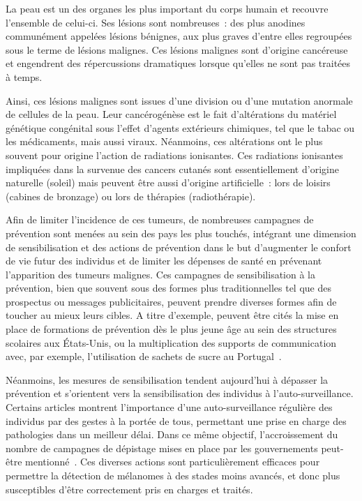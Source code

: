 \renewcommand{\thechapter}{\roman{chapter}}
\setcounter{chapter}{1}
\setcounter{figure}{0}

\label{chap:introduction}
La peau est un des organes les plus important du corps humain et recouvre l'ensemble de celui-ci. Ses lésions sont nombreuses~: des plus anodines communément appelées lésions bénignes, aux plus graves d'entre elles regroupées sous le terme de lésions malignes. Ces lésions malignes sont d'origine cancéreuse et engendrent des répercussions dramatiques lorsque qu'elles ne sont pas traitées à temps.\par

Ainsi, ces lésions malignes sont issues d’une division ou d’une mutation anormale de cellules de la peau. Leur cancérogénèse est le fait d'altérations du matériel génétique congénital sous l'effet d'agents extérieurs chimiques, tel que le tabac ou les médicaments, mais aussi viraux. Néanmoins, ces altérations ont le plus souvent pour origine l'action de radiations ionisantes. Ces radiations ionisantes impliquées dans la survenue des cancers cutanés sont essentiellement d'origine naturelle (soleil) mais peuvent être aussi d'origine artificielle~: lors de loisirs (cabines de bronzage) ou lors de thérapies (radiothérapie).\par

Afin de limiter l’incidence de ces tumeurs, de nombreuses campagnes de prévention sont menées au sein des pays les plus touchés, intégrant une dimension de sensibilisation et des actions de prévention dans le but d’augmenter le confort de vie futur des individus et de limiter les dépenses de santé en prévenant l'apparition des tumeurs malignes. Ces campagnes de sensibilisation à la prévention, bien que souvent sous des formes plus traditionnelles tel que des prospectus ou messages publicitaires, peuvent prendre diverses formes afin de toucher au mieux leurs cibles. A titre d’exemple, 
peuvent être cités la mise en place de formations de prévention dès le plus jeune âge au sein des structures scolaires aux États-Unis, ou la multiplication des supports de communication avec, par exemple, l’utilisation de sachets de sucre au Portugal~\cite{Correia2017,Guy2016}.\par 

Néanmoins, les mesures de sensibilisation tendent aujourd’hui à dépasser la prévention et s'orientent vers la sensibilisation des individus à l'auto-surveillance. Certains articles montrent l’importance d’une auto-surveillance régulière des individus par des gestes à la portée de tous, permettant une prise en charge des pathologies dans un meilleur délai. Dans ce même objectif, l’accroissement du nombre de campagnes de dépistage mises en place par les gouvernements peut-être mentionné~\cite{Friedman1985}. Ces diverses actions sont particulièrement efficaces pour permettre la détection de mélanomes à des stades moins avancés, et donc plus susceptibles d'être correctement pris en charges et traités.\par

